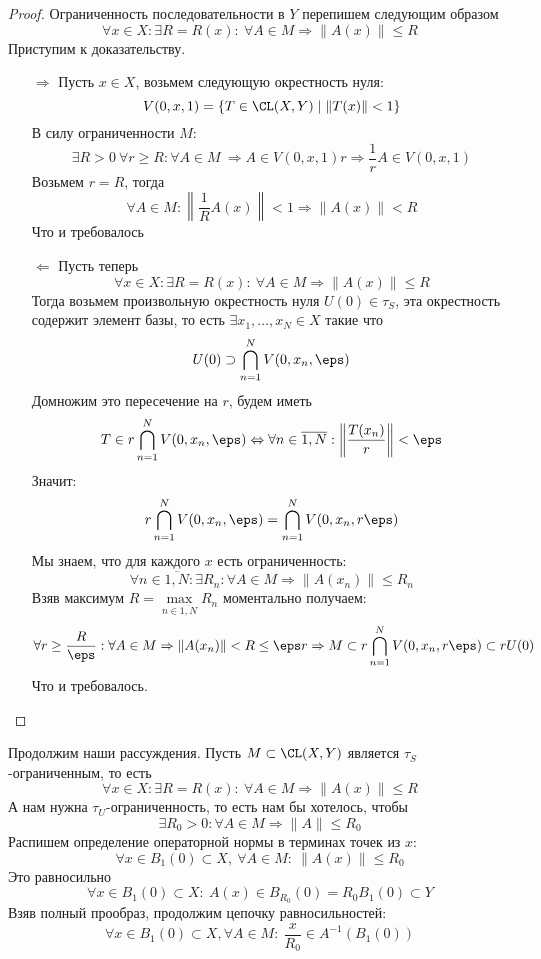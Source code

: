 \begin{proof}
Ограниченность последовательности в $Y$ перепишем следующим образом
$$
\forall x \in X: \exists R = R(x): \ \forall A \in M \Rightarrow \|A(x)\| \leq R
$$
Приступим к доказательству.
\begin{enumerate}
	\item[$\Rightarrow$] Пусть $x\in X$, возьмем следующую окрестность нуля:
	$$
	V(0,x,1) = \{T \in \CL(X, Y) \mid \|T(x)\| < 1\}
	$$
	В силу ограниченности $M$: 
	$$
	\exists R > 0 \ \forall r \geq R: \forall A \in M \ \Rightarrow A \in V(0,x,1)r \Rightarrow \frac{1}{r}A \in V(0,x,1)
	$$
	Возьмем $r = R$, тогда
	$$
	\forall A \in M \colon \left\|\frac{1}{R}A(x)\right\| < 1 \Rightarrow \|A(x)\| < R
	$$
	Что и требовалось 
	\item[$\Leftarrow$] Пусть теперь 
	$$
	\forall x \in X: \exists R = R(x): \ \forall A \in M \Rightarrow \|A(x)\| \leq R
	$$
	Тогда возьмем произвольную окрестность нуля $U(0) \in \tau_S$, эта окрестность содержит элемент базы, то есть $\exists x_1, \dots, x_N \in X$ такие что
	$$
	U(0) \supset \bigcap_{n =1}^N V(0, x_n, \eps )
	$$
	Домножим это пересечение на $r$, будем иметь
	$$
	T \in r\bigcap_{n =1}^N V(0, x_n, \eps ) \Leftrightarrow \forall n \in \overline{1, N}: \left\|\frac{T(x_n)}{r}\right\| < \eps 
	$$
	Значит:
	$$
	r\bigcap_{n =1}^N V(0, x_n, \eps ) = \bigcap_{n =1}^N V(0, x_n, r\eps )
	$$
	Мы знаем, что для каждого $x$ есть ограниченность:
	$$
	\forall n \in \overline{1, N}: \exists R_n : \forall A \in M \Rightarrow\|A(x_n)\| \leq R_n
	$$
	Взяв максимум $R = \max\limits_{n \in \overline{1,N}}R_n$ моментально получаем:
	$$
	\forall r \geq \frac{R}{\eps}: \forall A \in M \Rightarrow \|A(x_n)\| < R \leq \eps r  \Rightarrow M \subset r\bigcap_{n =1}^N V(0, x_n, r\eps ) \subset rU(0)
	$$
	Что и требовалось.
\end{enumerate}
\end{proof}
Продолжим наши рассуждения. Пусть $M \subset \CL(X, Y)$ является $\tau_S$-ограниченным, то есть 
$$
\forall x \in X: \exists R = R(x): \ \forall A \in M \Rightarrow \|A(x)\| \leq R
$$
А нам нужна $\tau_U$-ограниченность, то есть нам бы хотелось, чтобы
$$
\exists R_0 > 0: \forall 
A \in M \Rightarrow \|A\| \leq R_0
$$
Распишем определение операторной нормы в терминах точек из $x$: 
$$
\forall x \in B_1(0) \subset X, \ \forall 
A \in M: \ \|A(x)\| \leq R_0
$$
Это равносильно
$$
\forall x \in B_1(0) \subset X: \ A(x) \in B_{R_0}(0) = R_0B_1(0) \subset Y
$$
Взяв полный прообраз, продолжим цепочку равносильностей:
$$
\forall x \in B_1(0) \subset X, \forall A \in M : \ \frac{x}{R_0} \in A^{-1}(B_1(0))
$$

